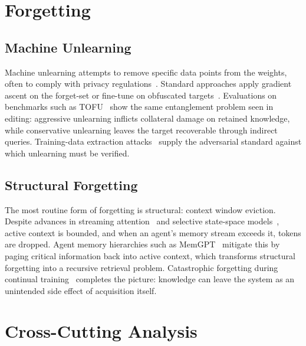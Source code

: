 \documentclass[10pt]{article}
\begin{document}
\section{Forgetting}
\label{sec:forgetting}

\subsection{Machine Unlearning}

Machine unlearning attempts to remove specific data points from the weights, often to comply with privacy regulations~\citep{jang2023unlearning}. Standard approaches apply gradient ascent on the forget-set or fine-tune on obfuscated targets~\citep{eldan2023harrypotter}. Evaluations on benchmarks such as TOFU~\citep{maini2024tofu} show the same entanglement problem seen in editing: aggressive unlearning inflicts collateral damage on retained knowledge, while conservative unlearning leaves the target recoverable through indirect queries. Training-data extraction attacks~\citep{carlini2021extraction} supply the adversarial standard against which unlearning must be verified.

\subsection{Structural Forgetting}

The most routine form of forgetting is structural: context window eviction. Despite advances in streaming attention~\citep{xiao2024streamingllm} and selective state-space models~\citep{gu2023mamba}, active context is bounded, and when an agent's memory stream exceeds it, tokens are dropped. Agent memory hierarchies such as MemGPT~\citep{packer2023memgpt} mitigate this by paging critical information back into active context, which transforms structural forgetting into a recursive retrieval problem. Catastrophic forgetting during continual training~\citep{kirkpatrick2017ewc, luo2023catastrophic} completes the picture: knowledge can leave the system as an unintended side effect of acquisition itself.

\section{Cross-Cutting Analysis}
\label{sec:analysis}
\end{document}
